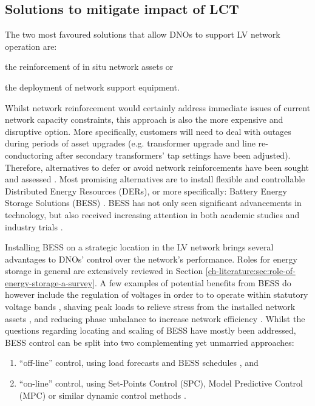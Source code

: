 \subsection{Solutions to mitigate impact of LCT}
\label{ch-introduction:subsec:solutions-to-mitigate-impact-of-lct}

The two most favoured solutions that allow DNOs to support LV network operation are:
\begin{enumerate*}
	\item the reinforcement of in situ network assets or
	\item the deployment of network support equipment.
\end{enumerate*}
Whilst network reinforcement would certainly address immediate issues of current network capacity constraints, this approach is also the more expensive and disruptive option.
More specifically, customers will need to deal with outages during periods of asset upgrades (e.g. transformer upgrade and line re-conductoring after secondary transformers' tap settings have been adjusted).
Therefore, alternatives to defer or avoid network reinforcements have been sought and assessed \cite{Harrison2007, Zangs2016a, VanderKlauw2016d, Greenwood2017}.
Most promising alternatives are to install flexible and controllable Distributed Energy Resources (DERs), or more specifically: Battery Energy Storage Solutions (BESS) \cite{Wade2010}.
BESS has not only seen significant advancements in technology, but also received increasing attention in both academic studies and industry trials \cite{Palizban2016}.

Installing BESS on a strategic location in the LV network brings several advantages to DNOs' control over the network's performance.
Roles for energy storage in general are extensively reviewed in Section \ref{ch-literature:sec:role-of-energy-storage-a-survey}.
A few examples of potential benefits from BESS do however include the regulation of voltages in order to to operate within statutory voltage bands \cite{Yang2014}, shaving peak loads to relieve stress from the installed network assets \cite{Bennett2015}, and reducing phase unbalance to increase network efficiency \cite{Wang2015b} .
Whilst the questions regarding locating and scaling of BESS have mostly been addressed, BESS control can be split into two complementing yet unmarried approaches:

\begin{enumerate}
	\item ``off-line'' control, using load forecasts and BESS schedules \cite{Cecati2011, Chaouachi2013, Palma-Behnke2013, Khodaei2014}, and
	\item ``on-line'' control, using Set-Points Control (SPC), Model Predictive Control (MPC) or similar dynamic control methods \cite{Salinas2013, Huang2013, Huang2014a, Sun2014a}.
\end{enumerate}

